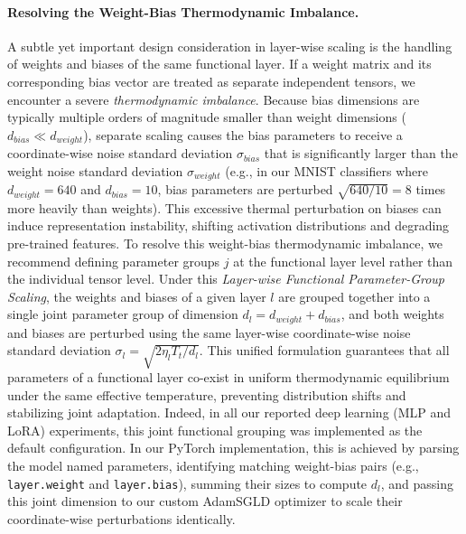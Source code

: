 \paragraph{Resolving the Weight-Bias Thermodynamic Imbalance.} A subtle yet important design consideration in layer-wise scaling is the handling of weights and biases of the same functional layer.
If a weight matrix and its corresponding bias vector are treated as separate independent tensors, we encounter a severe \emph{thermodynamic imbalance}.
Because bias dimensions are typically multiple orders of magnitude smaller than weight dimensions ($d_{bias} \ll d_{weight}$), separate scaling causes the bias parameters to receive a coordinate-wise noise standard deviation $\sigma_{bias}$ that is significantly larger than the weight noise standard deviation $\sigma_{weight}$ (e.g., in our MNIST classifiers where $d_{weight}=640$ and $d_{bias}=10$, bias parameters are perturbed $\sqrt{640/10} = 8$ times more heavily than weights).
This excessive thermal perturbation on biases can induce representation instability, shifting activation distributions and degrading pre-trained features.
To resolve this weight-bias thermodynamic imbalance, we recommend defining parameter groups $j$ at the functional layer level rather than the individual tensor level.
Under this \emph{Layer-wise Functional Parameter-Group Scaling}, the weights and biases of a given layer $l$ are grouped together into a single joint parameter group of dimension $d_l = d_{weight} + d_{bias}$, and both weights and biases are perturbed using the same layer-wise coordinate-wise noise standard deviation $\sigma_l = \sqrt{2 \eta_l T_t / d_l}$.
This unified formulation guarantees that all parameters of a functional layer co-exist in uniform thermodynamic equilibrium under the same effective temperature, preventing distribution shifts and stabilizing joint adaptation.
Indeed, in all our reported deep learning (MLP and LoRA) experiments, this joint functional grouping was implemented as the default configuration.
In our PyTorch implementation, this is achieved by parsing the model named parameters, identifying matching weight-bias pairs (e.g., \texttt{layer.weight} and \texttt{layer.bias}), summing their sizes to compute $d_l$, and passing this joint dimension to our custom AdamSGLD optimizer to scale their coordinate-wise perturbations identically.

